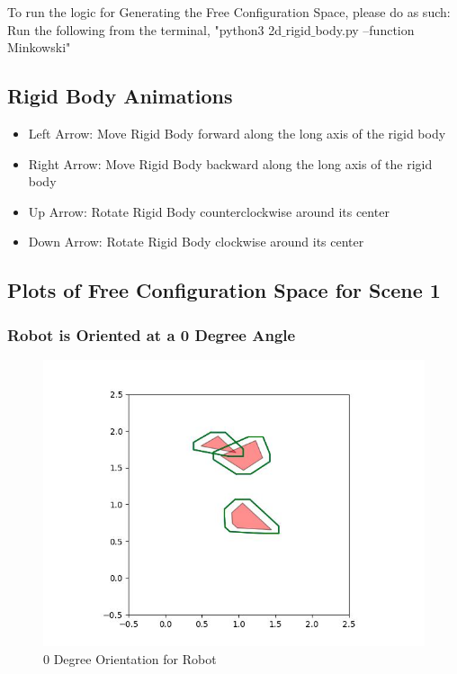 \documentclass{article}
\begin{document}
To run the logic for Generating the Free Configuration Space, please do as such: \newline 
Run the following from the terminal, "python3 2d$\_$rigid$\_$body.py --function Minkowski"

\subsection{Rigid Body Animations}
\begin{itemize}
    \item Left Arrow: Move Rigid Body forward along the long axis of the rigid body
    \item Right Arrow: Move Rigid Body backward along the long axis of the rigid body
    \item Up Arrow: Rotate Rigid Body counterclockwise around its center
    \item Down Arrow: Rotate Rigid Body clockwise around its center
\end{itemize}


\subsection{Plots of Free Configuration Space for Scene 1}
\subsubsection{Robot is Oriented at a 0 Degree Angle}
\begin{figure}[h!]
	\includegraphics[width= 0.9 \linewidth]{Problem3_minkowski1_0.jpg}
	\centering
	\caption{0 Degree Orientation for Robot}
	\label{Problem3_minkowski1_0.jpg}
\end{figure}
\end{document}
